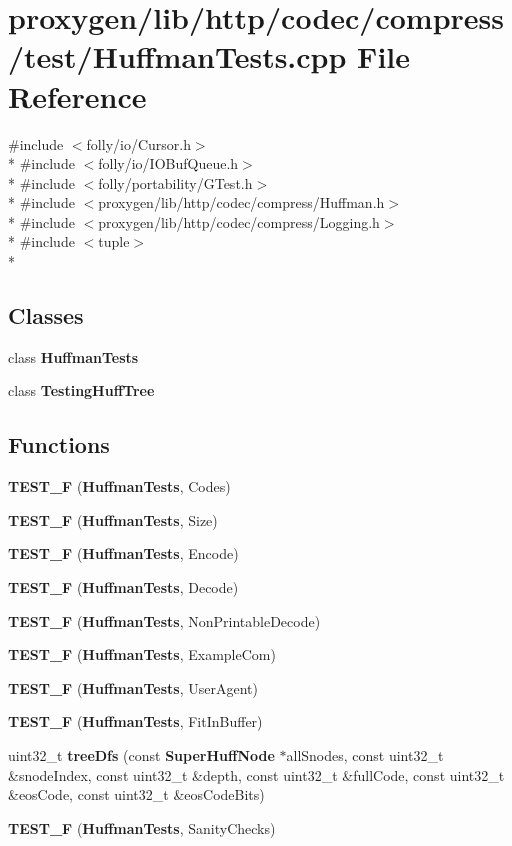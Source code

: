 \section{proxygen/lib/http/codec/compress/test/\+Huffman\+Tests.cpp File Reference}
\label{HuffmanTests_8cpp}
{\ttfamily \#include $<$folly/io/\+Cursor.\+h$>$}\\*
{\ttfamily \#include $<$folly/io/\+I\+O\+Buf\+Queue.\+h$>$}\\*
{\ttfamily \#include $<$folly/portability/\+G\+Test.\+h$>$}\\*
{\ttfamily \#include $<$proxygen/lib/http/codec/compress/\+Huffman.\+h$>$}\\*
{\ttfamily \#include $<$proxygen/lib/http/codec/compress/\+Logging.\+h$>$}\\*
{\ttfamily \#include $<$tuple$>$}\\*
\subsection*{Classes}
\begin{DoxyCompactItemize}
\item 
class {\bf Huffman\+Tests}
\item 
class {\bf Testing\+Huff\+Tree}
\end{DoxyCompactItemize}
\subsection*{Functions}
\begin{DoxyCompactItemize}
\item 
{\bf T\+E\+S\+T\+\_\+F} ({\bf Huffman\+Tests}, Codes)
\item 
{\bf T\+E\+S\+T\+\_\+F} ({\bf Huffman\+Tests}, Size)
\item 
{\bf T\+E\+S\+T\+\_\+F} ({\bf Huffman\+Tests}, Encode)
\item 
{\bf T\+E\+S\+T\+\_\+F} ({\bf Huffman\+Tests}, Decode)
\item 
{\bf T\+E\+S\+T\+\_\+F} ({\bf Huffman\+Tests}, Non\+Printable\+Decode)
\item 
{\bf T\+E\+S\+T\+\_\+F} ({\bf Huffman\+Tests}, Example\+Com)
\item 
{\bf T\+E\+S\+T\+\_\+F} ({\bf Huffman\+Tests}, User\+Agent)
\item 
{\bf T\+E\+S\+T\+\_\+F} ({\bf Huffman\+Tests}, Fit\+In\+Buffer)
\item 
uint32\+\_\+t {\bf tree\+Dfs} (const {\bf Super\+Huff\+Node} $\ast$all\+Snodes, const uint32\+\_\+t \&snode\+Index, const uint32\+\_\+t \&depth, const uint32\+\_\+t \&full\+Code, const uint32\+\_\+t \&eos\+Code, const uint32\+\_\+t \&eos\+Code\+Bits)
\item 
{\bf T\+E\+S\+T\+\_\+F} ({\bf Huffman\+Tests}, Sanity\+Checks)
\end{DoxyCompactItemize}


